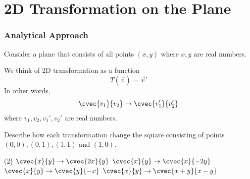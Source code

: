 \section[2D on plane]{2D Transformation on the Plane}
\frame{\sectionpage}

\begin{frame}
\end{frame}

\begin{frame}
\frametitle{Analytical Approach}
Consider a plane that consists of all points $(x,y)$ where $x,y$ are real numbers.

We think of 2D transformation as a function 
\[ T(\vec{v}) = \vec{v}'\]
In other words,
\[\cvec{v_1}{v_2} \to \cvec{v_1'}{v_2'}\]
where $v_1, v_2, v_1', v_2'$ are real numbers.
\end{frame}


\begin{frame}[t]
\begin{ex}
Describe how each transformation change the square consisting of points $(0,0), (0,1), (1,1)$ and $(1,0)$.
\begin{tasks}(2)
\task $\cvec{x}{y} \to \cvec{2x}{y}$
\task $\cvec{x}{y} \to \cvec{x}{-2y}$
\task $\cvec{x}{y} \to \cvec{y}{-x}$
\task $\cvec{x}{y} \to \cvec{x+y}{x-y}$
\end{tasks}
\end{ex}
\end{frame}

